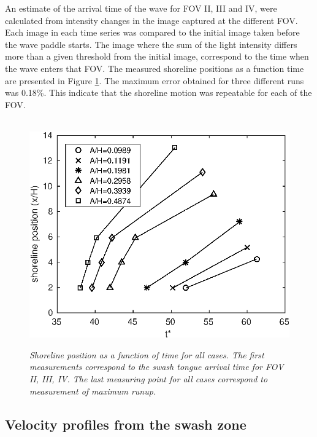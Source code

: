 \documentclass[review, authoryear]{elsarticle}
\begin{document}
An estimate of the arrival time of the wave for FOV II, III and IV, were calculated from intensity changes in the image captured at the different FOV.  Each image in each time series was compared to the initial image taken before the wave paddle starts. The image where the sum of the light intensity differs more than a given threshold from the initial image, correspond to the time when the wave enters that FOV. The measured shoreline positions as a function time are presented in Figure \ref{fig:arr_tim}. The maximum error obtained for three different runs was 0.18\%. This indicate that the shoreline motion was repeatable for each of the FOV.
\begin{figure}
        \centering
        ~ %
                \includegraphics[scale=0.6]{./Figures/shoreline2016_r.eps}
                \caption{\textit{Shoreline position as a function of time for all cases. The first measurements correspond to the swash tongue arrival time for FOV II, III, IV. The last measuring point for all cases correspond to measurement of maximum runup.}}
              \label{fig:arr_tim}
      \end{figure}


\subsection{Velocity profiles from the swash zone}
\label{vel_pro}
\end{document}
